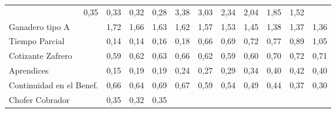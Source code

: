 \begin{tabular}{lllllllllll}
  \multicolumn{1}{|r}{0,35} &
  \multicolumn{1}{r}{0,33} &
  \multicolumn{1}{r}{0,32} &
  \multicolumn{1}{r}{0,28} &
  \multicolumn{1}{r}{3,38} &
  \multicolumn{1}{r}{3,03} &
  \multicolumn{1}{r}{2,34} &
  \multicolumn{1}{r}{2,04} &
  \multicolumn{1}{r}{1,85} &
  \multicolumn{1}{r}{1,52} \\
\multicolumn{1}{l}{\hspace{1em}Ganadero tipo A} &
  \multicolumn{1}{|r}{1,72} &
  \multicolumn{1}{r}{1,66} &
  \multicolumn{1}{r}{1,63} &
  \multicolumn{1}{r}{1,62} &
  \multicolumn{1}{r}{1,57} &
  \multicolumn{1}{r}{1,53} &
  \multicolumn{1}{r}{1,45} &
  \multicolumn{1}{r}{1,38} &
  \multicolumn{1}{r}{1,37} &
  \multicolumn{1}{r}{1,36} \\
\multicolumn{1}{l}{\hspace{1em}Tiempo Parcial} &
  \multicolumn{1}{|r}{0,14} &
  \multicolumn{1}{r}{0,14} &
  \multicolumn{1}{r}{0,16} &
  \multicolumn{1}{r}{0,18} &
  \multicolumn{1}{r}{0,66} &
  \multicolumn{1}{r}{0,69} &
  \multicolumn{1}{r}{0,72} &
  \multicolumn{1}{r}{0,77} &
  \multicolumn{1}{r}{0,89} &
  \multicolumn{1}{r}{1,05} \\
\multicolumn{1}{l}{\hspace{1em}Cotizante Zafrero} &
  \multicolumn{1}{|r}{0,59} &
  \multicolumn{1}{r}{0,62} &
  \multicolumn{1}{r}{0,63} &
  \multicolumn{1}{r}{0,66} &
  \multicolumn{1}{r}{0,62} &
  \multicolumn{1}{r}{0,59} &
  \multicolumn{1}{r}{0,60} &
  \multicolumn{1}{r}{0,70} &
  \multicolumn{1}{r}{0,72} &
  \multicolumn{1}{r}{0,71} \\
\multicolumn{1}{l}{\hspace{1em}Aprendices} &
  \multicolumn{1}{|r}{0,15} &
  \multicolumn{1}{r}{0,19} &
  \multicolumn{1}{r}{0,19} &
  \multicolumn{1}{r}{0,24} &
  \multicolumn{1}{r}{0,27} &
  \multicolumn{1}{r}{0,29} &
  \multicolumn{1}{r}{0,34} &
  \multicolumn{1}{r}{0,40} &
  \multicolumn{1}{r}{0,42} &
  \multicolumn{1}{r}{0,40} \\
\multicolumn{1}{l}{\hspace{1em}Continuidad en el Benef.} &
  \multicolumn{1}{|r}{0,66} &
  \multicolumn{1}{r}{0,64} &
  \multicolumn{1}{r}{0,69} &
  \multicolumn{1}{r}{0,67} &
  \multicolumn{1}{r}{0,59} &
  \multicolumn{1}{r}{0,54} &
  \multicolumn{1}{r}{0,49} &
  \multicolumn{1}{r}{0,44} &
  \multicolumn{1}{r}{0,37} &
  \multicolumn{1}{r}{0,30} \\
\multicolumn{1}{l}{\hspace{1em}Chofer Cobrador} &
  \multicolumn{1}{|r}{0,35} &
  \multicolumn{1}{r}{0,32} &
  \multicolumn{1}{r}{0,35} &

\end{tabular}
